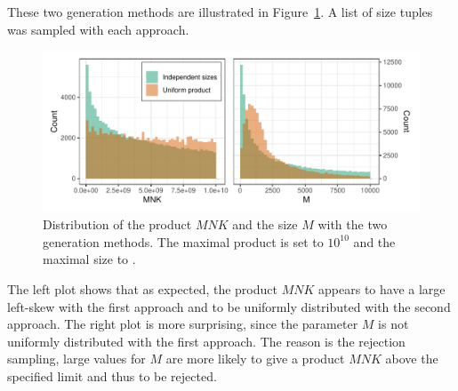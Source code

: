             These two generation methods are illustrated in Figure~\ref{fig:parameter_space}. A list of 
            size tuples was sampled with each approach.

            \begin{figure}[htpb]
                \centering
                \includegraphics[width=\linewidth]{img/experiment/parameter_space/distribution.pdf}
                \caption{Distribution of the product \(MNK\) and the size \(M\) with the two generation methods. The
                maximal product is set to \(10^{10}\) and the maximal size to .}%
                \label{fig:parameter_space}
            \end{figure}

            The left plot shows that as expected, the product \(MNK\) appears to have a large left-skew with the first
            approach and to be uniformly distributed with the second approach. The right plot is more surprising, since
            the parameter \(M\) is not uniformly distributed with the first approach. The reason is the rejection
            sampling, large values for \(M\) are more likely to give a product \(MNK\) above the specified limit and
            thus to be rejected.

